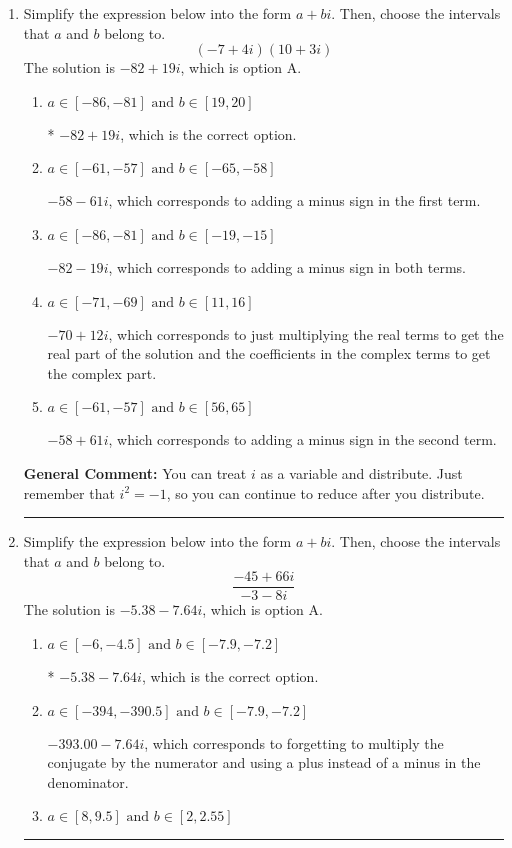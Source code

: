 \documentclass{extbook}[14pt]
\newcommand{\litem}[1]{\item #1

\rule{\textwidth}{0.4pt}}
\begin{document}
\begin{enumerate}\litem{
Simplify the expression below into the form $a+bi$. Then, choose the intervals that $a$ and $b$ belong to.
\[ (-7 + 4 i)(10 + 3 i) \]The solution is \( -82 + 19 i \), which is option A.\begin{enumerate}[label=\Alph*.]
\item \( a \in [-86, -81] \text{ and } b \in [19, 20] \)

* $-82 + 19 i$, which is the correct option.
\item \( a \in [-61, -57] \text{ and } b \in [-65, -58] \)

 $-58 - 61 i$, which corresponds to adding a minus sign in the first term.
\item \( a \in [-86, -81] \text{ and } b \in [-19, -15] \)

 $-82 - 19 i$, which corresponds to adding a minus sign in both terms.
\item \( a \in [-71, -69] \text{ and } b \in [11, 16] \)

 $-70 + 12 i$, which corresponds to just multiplying the real terms to get the real part of the solution and the coefficients in the complex terms to get the complex part.
\item \( a \in [-61, -57] \text{ and } b \in [56, 65] \)

 $-58 + 61 i$, which corresponds to adding a minus sign in the second term.
\end{enumerate}

\textbf{General Comment:} You can treat $i$ as a variable and distribute. Just remember that $i^2=-1$, so you can continue to reduce after you distribute.
}
\litem{
Simplify the expression below into the form $a+bi$. Then, choose the intervals that $a$ and $b$ belong to.
\[ \frac{-45 + 66 i}{-3 - 8 i} \]The solution is \( -5.38  - 7.64 i \), which is option A.\begin{enumerate}[label=\Alph*.]
\item \( a \in [-6, -4.5] \text{ and } b \in [-7.9, -7.2] \)

* $-5.38  - 7.64 i$, which is the correct option.
\item \( a \in [-394, -390.5] \text{ and } b \in [-7.9, -7.2] \)

 $-393.00  - 7.64 i$, which corresponds to forgetting to multiply the conjugate by the numerator and using a plus instead of a minus in the denominator.
\item \( a \in [8, 9.5] \text{ and } b \in [2, 2.55] \)


\end{enumerate}}
\end{enumerate}
\end{document}
